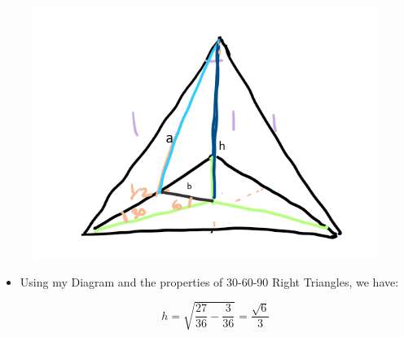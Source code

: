\documentclass[]{report}
\begin{document}
	\begin{figure}[H]
		\centering
		\includegraphics[width=0.7\linewidth]{pics/p3}
	\end{figure}
	
	\begin{itemize}
		\item Using my Diagram and the properties of 30-60-90 Right Triangles, we have:
		
		$$ h = \sqrt{ \frac{27}{36} - \frac{3}{36} } = \frac{\sqrt{6}}{3}  $$
	\end{itemize}

	\begin{flushright}
		\smiley{}
	\end{flushright}
	

	
	
\end{document}
